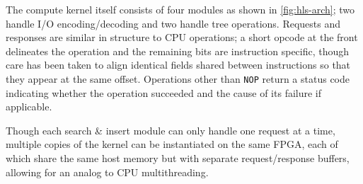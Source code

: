The compute kernel itself consists of four modules as shown in
\autoref{fig:hls-arch}; two handle I/O encoding/decoding and two handle tree
operations. Requests and responses are similar in structure to CPU operations; a
short opcode at the front delineates the operation and the remaining bits are
instruction specific, though care has been taken to align identical fields
shared between instructions so that they appear at the same offset. Operations
other than \texttt{NOP} return a status code indicating whether the operation
succeeded and the cause of its failure if applicable.

Though each search \& insert module can only handle one request at a time,
multiple copies of the kernel can be instantiated on the same FPGA, each of
which share the same host memory but with separate request/response buffers,
allowing for an analog to CPU multithreading.
